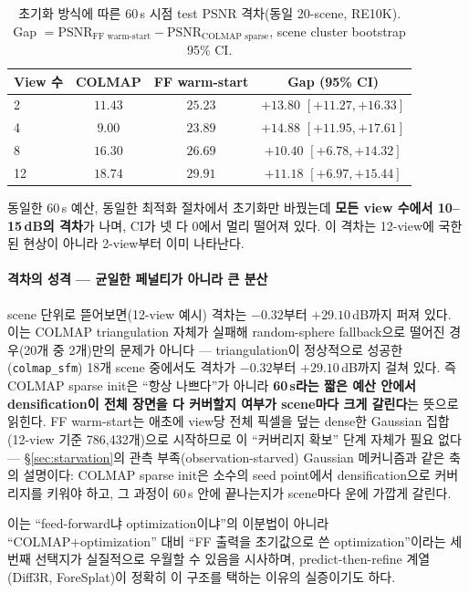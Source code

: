 \begin{table}[h]
\centering
\caption{초기화 방식에 따른 60\,s 시점 test PSNR 격차(동일 20-scene, RE10K). Gap $= \mathrm{PSNR}_{\text{FF warm-start}} - \mathrm{PSNR}_{\text{COLMAP sparse}}$, scene cluster bootstrap 95\% CI.}
\label{tab:init-comparison}
\small
\begin{tabular}{@{}l ccc@{}}
\toprule
View 수 & COLMAP & FF warm-start & Gap (95\% CI) \\
\midrule
2  & $11.43$ & $25.23$ & $+13.80$ $[+11.27, +16.33]$ \\
4  & $9.00$  & $23.89$ & $+14.88$ $[+11.95, +17.61]$ \\
8  & $16.30$ & $26.69$ & $+10.40$ $[+6.78, +14.32]$ \\
12 & $18.74$ & $29.91$ & $+11.18$ $[+6.97, +15.44]$ \\
\bottomrule
\end{tabular}
\end{table}

동일한 60\,s 예산, 동일한 최적화 절차에서 초기화만 바꿨는데 \textbf{모든 view 수에서 10--15\,dB의 격차}가 나며, CI가 넷 다 0에서 멀리 떨어져 있다. 이 격차는 12-view에 국한된 현상이 아니라 2-view부터 이미 나타난다.

\paragraph{격차의 성격 — 균일한 페널티가 아니라 큰 분산} scene 단위로 뜯어보면(12-view 예시) 격차는 $-0.32$부터 $+29.10\,$dB까지 퍼져 있다. 이는 COLMAP triangulation 자체가 실패해 random-sphere fallback으로 떨어진 경우(20개 중 2개)만의 문제가 아니다 — triangulation이 정상적으로 성공한(\texttt{colmap\_sfm}) 18개 scene 중에서도 격차가 $-0.32$부터 $+29.10\,$dB까지 걸쳐 있다. 즉 COLMAP sparse init은 ``항상 나쁘다''가 아니라 \textbf{60\,s라는 짧은 예산 안에서 densification이 전체 장면을 다 커버할지 여부가 scene마다 크게 갈린다}는 뜻으로 읽힌다. FF warm-start는 애초에 view당 전체 픽셀을 덮는 dense한 Gaussian 집합(12-view 기준 786{,}432개)으로 시작하므로 이 ``커버리지 확보'' 단계 자체가 필요 없다 — \S\ref{sec:starvation}의 관측 부족(observation-starved) Gaussian 메커니즘과 같은 축의 설명이다: COLMAP sparse init은 소수의 seed point에서 densification으로 커버리지를 키워야 하고, 그 과정이 60\,s 안에 끝나는지가 scene마다 운에 가깝게 갈린다.

이는 ``feed-forward냐 optimization이냐''의 이분법이 아니라 ``COLMAP+optimization'' 대비 ``FF 출력을 초기값으로 쓴 optimization''이라는 세 번째 선택지가 실질적으로 우월할 수 있음을 시사하며, predict-then-refine 계열(Diff3R, ForeSplat)이 정확히 이 구조를 택하는 이유의 실증이기도 하다.

